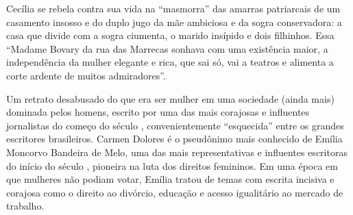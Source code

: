 \hspace*{-7cm}\hrulefill\hspace*{-7cm}

\medskip

\noindent{}Cecília se rebela contra sua vida na “masmorra” das amarras patriarcais de um casamento insosso e do duplo jugo da mãe ambiciosa e da sogra conservadora: a casa que divide com a sogra ciumenta, o marido insípido e dois filhinhos. Essa “Madame Bovary da rua das Marrecas sonhava com uma existência maior, a independência da mulher elegante e rica, que sai só, vai a teatros e alimenta a corte ardente de muitos admiradores”.

Um retrato desabusado do que era ser mulher em uma sociedade (ainda mais) dominada pelos homens, escrito por uma das mais corajosas e influentes jornalistas do começo do século , convenientemente “esquecida” entre os grandes escritores brasileiros. Carmen Dolores é o pseudônimo mais conhecido de Emília Moncorvo Bandeira de Melo, uma das mais representativas e influentes escritoras do início do século , pioneira na luta dos direitos femininos. Em uma época em que mulheres não podiam votar, Emília tratou de temas com escrita incisiva e corajosa como o direito ao divórcio, educação e acesso igualitário ao mercado de trabalho. 


\vfill

\hspace*{-.4cm}\begin{minipage}[c]{.5\linewidth}
\small{
{}}
\end{minipage}

\pagebreak
\pagestyle{imacat}


